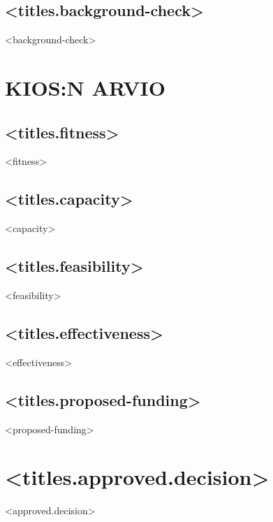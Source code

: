 \documentclass[twoside,a4paper]{article}
\begin{document}
		\subsection*{<titles.background-check>}
		    <background-check>
		
		\newpage	
		\section{KIOS:N ARVIO}
		\subsection*{<titles.fitness>}
		    <fitness>
		
		\subsection*{<titles.capacity>}
		    <capacity>
		
		\subsection*{<titles.feasibility>}		
		    <feasibility>
		
		\subsection*{<titles.effectiveness>}	
		    <effectiveness>
		
		\subsection*{<titles.proposed-funding>}
		    <proposed-funding>
		
		\newpage
	\section{<titles.approved.decision>}		
		<approved.decision>
	
\end{document}
